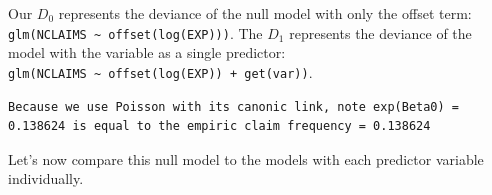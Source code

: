 \documentclass[
  english,
  11pt,
]{article}
\newenvironment{Shaded}{\begin{snugshade}}{\end{snugshade}}
\newcommand{\AttributeTok}[1]{\textcolor[rgb]{0.13,0.29,0.53}{#1}}
\newcommand{\DecValTok}[1]{\textcolor[rgb]{0.00,0.00,0.81}{#1}}
\newcommand{\FunctionTok}[1]{\textcolor[rgb]{0.13,0.29,0.53}{\textbf{#1}}}
\newcommand{\NormalTok}[1]{#1}
\newcommand{\OtherTok}[1]{\textcolor[rgb]{0.56,0.35,0.01}{#1}}
\newcommand{\SpecialCharTok}[1]{\textcolor[rgb]{0.81,0.36,0.00}{\textbf{#1}}}
\newcommand{\StringTok}[1]{\textcolor[rgb]{0.31,0.60,0.02}{#1}}
\begin{document}
Our \(D_0\) represents the deviance of the null model with only the
offset term: \texttt{glm(NCLAIMS\ \textasciitilde{}\ offset(log(EXP)))}.
The \(D_1\) represents the deviance of the model with the variable as a
single predictor:
\texttt{glm(NCLAIMS\ \textasciitilde{}\ offset(log(EXP))\ +\ get(var))}.

\begin{Shaded}
\end{Shaded}

\begin{verbatim}
Because we use Poisson with its canonic link, note exp(Beta0) = 0.138624 is equal to the empiric claim frequency = 0.138624
\end{verbatim}

Let's now compare this null model to the models with each predictor
variable individually.
\end{document}
